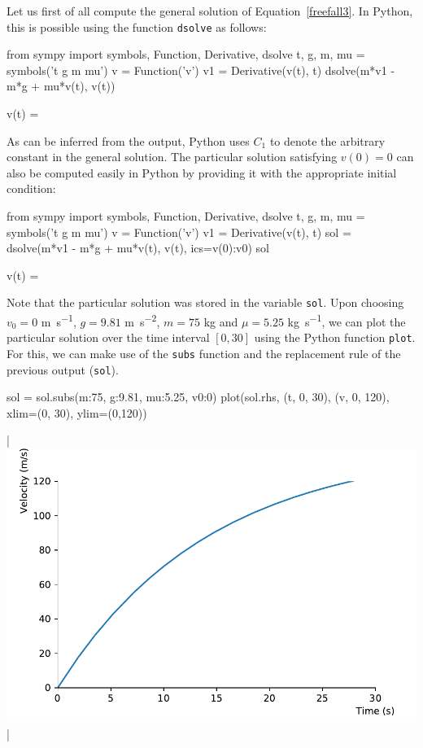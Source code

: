\begin{example}
\ifpython
Let us first of all compute the general solution  of Equation~\eqref{freefall3}. In Python, this is possible using the function \lstinline{dsolve} as follows: 
\begin{pyin}
from sympy import symbols, Function, Derivative, dsolve
t, g, m, mu = symbols('t g m mu')
v = Function('v')
v1 = Derivative(v(t), t)
dsolve(m*v1 - m*g + mu*v(t), v(t))
\end{pyin}
\begin{pyout}
v(t) = 
\end{pyout}
As can be inferred from the output, Python uses $C_1$ to denote the arbitrary constant in the general solution. The particular solution satisfying $v(0)=0$ can also be computed easily in Python by providing it with the appropriate initial condition:
\begin{pyin}
from sympy import symbols, Function, Derivative, dsolve
t, g, m, mu = symbols('t g m mu')
v = Function('v')
v1 = Derivative(v(t), t)
sol = dsolve(m*v1 - m*g + mu*v(t), v(t), ics={v(0):v0})
sol
\end{pyin}
\begin{pyout}
v(t) = 
\end{pyout}

Note that the particular solution was stored in the variable \lstinline{sol}. Upon choosing $v_0=0$ \si{m.s^{-1}}, $g=9.81$ \si{m.s^{-2}}, $m=75$ \si{kg} and $\mu=5.25$ \si{kg.s^{-1}}, we can plot the particular solution over the time interval $[0,30]$ using the Python function \lstinline{plot}. 
For this, we can make use of the \lstinline{subs} function and the replacement rule of the previous output (\lstinline{sol}).
\begin{pyin}
sol = sol.subs({m:75, g:9.81, mu:5.25, v0:0})
plot(sol.rhs, (t, 0, 30), (v, 0, 120), xlim=(0, 30), ylim=(0,120))
\end{pyin}
\begin{pyout}
|\includegraphics{figures/IntroDE/FreeFall_Math2_Python.pdf}|
\end{pyout}
\fi
\end{example}
